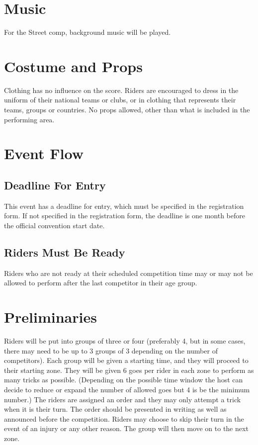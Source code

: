 \section{Music}
For the Street comp, background music will be played.

\section{Costume and Props}
Clothing has no influence on the score.
Riders are encouraged to dress in the uniform of their national teams or clubs, or in clothing that represents their teams, groups or countries.
No props allowed, other than what is included in the performing area.

\section{Event Flow}

\subsection{Deadline For Entry}

This event has a deadline for entry, which must be specified in the registration form.
If not specified in the registration form, the deadline is one month before the official convention start date.

\subsection{Riders Must Be Ready}

Riders who are not ready at their scheduled competition time may or may not be allowed to perform after the last competitor in their age group.

\section{Preliminaries}
Riders will be put into groups of three or four (preferably 4, but in some cases, there may need to be up to 3 groups of 3 depending on the number of competitors).
Each group will be given a starting time, and they will proceed to their starting zone.
They will be given 6 goes per rider in each zone to perform as many tricks as possible.
(Depending on the possible time window the host can decide to reduce or expand the number of allowed goes but 4 is be the minimum number.)
The riders are assigned an order and they may only attempt a trick when it is their turn.
The order should be presented in writing as well as announced before the competition.
Riders may choose to skip their turn in the event of an injury or any other reason.
The group will then move on to the next zone.


